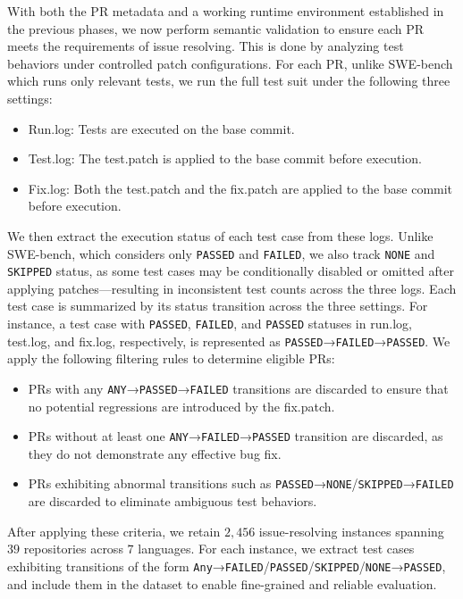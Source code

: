 \documentclass[11pt, a4paper, logo, copyright, nonumbering]{seed}
\begin{document}
With both the PR metadata and a working runtime environment established in the previous phases, we now perform semantic validation to ensure each PR meets the requirements of issue resolving. 
This is done by analyzing test behaviors under controlled patch configurations.
For each PR, unlike SWE-bench which runs only relevant tests, we run the full test suit under the following three settings:
\begin{itemize}[leftmargin=*]
    \item Run.log: Tests are executed on the base commit.
    \item Test.log: The test.patch is applied to the base commit before execution.
    \item Fix.log: Both the test.patch and the fix.patch are applied to the base commit before execution.
\end{itemize}
We then extract the execution status of each test case from these logs.
Unlike SWE-bench, which considers only \texttt{PASSED} and \texttt{FAILED}, we also track \texttt{NONE} and \texttt{SKIPPED} status, as some test cases may be conditionally disabled or omitted after applying patches—resulting in inconsistent test counts across the three logs.
Each test case is summarized by its status transition across the three settings. 
For instance, a test case with \texttt{PASSED}, \texttt{FAILED}, and \texttt{PASSED} statuses in run.log, test.log, and fix.log, respectively, is represented as \texttt{PASSED}→\texttt{FAILED}→\texttt{PASSED}.
We apply the following filtering rules to determine eligible PRs:
\begin{itemize}[leftmargin=*]
    \item PRs with any \texttt{ANY}→\texttt{PASSED}→\texttt{FAILED} transitions are discarded to ensure that no potential regressions are introduced by the fix.patch.
    \item PRs without at least one \texttt{ANY}→\texttt{FAILED}→\texttt{PASSED} transition are discarded, as they do not demonstrate any effective bug fix.
    \item PRs exhibiting abnormal transitions such as \texttt{PASSED}→\texttt{NONE}/\texttt{SKIPPED}→\texttt{FAILED} are discarded to eliminate ambiguous test behaviors.
\end{itemize}
After applying these criteria, we retain $2,456$ issue-resolving instances spanning $39$ repositories across $7$ languages.
For each instance, we extract test cases exhibiting transitions of the form \texttt{Any}→\texttt{FAILED}/\texttt{PASSED}/\texttt{SKIPPED}/\texttt{NONE}→\texttt{PASSED}, and include them in the dataset to enable fine-grained and reliable evaluation.
\end{document}

